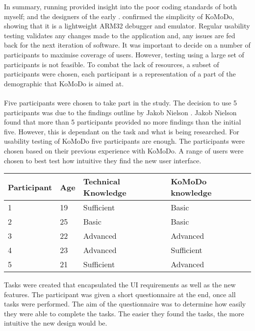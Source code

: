 In summary, running  provided insight into the poor coding standards of both myself; and the designers of the early .  confirmed the simplicity of KoMoDo, showing that it is a lightweight ARM32 debugger and emulator.
%
%
%
%
%
Regular usability testing validates any changes made to the application and, any issues are fed back for the next iteration of software. It was important to decide on a number of participants to maximise coverage of users. However, testing using a large set of participants is not feasible. To combat the lack of resources, a subset of participants were chosen, each participant is a representation of a part of the demographic that KoMoDo is aimed at.\\\\
%
Five participants were chosen to take part in the study. The decision to use 5 participants was due to the findings outline by Jakob Nielson \cite{usability_engineer}. Jakob Nielson found that more than 5 participants provided no more findings than the initial five. However, this is dependant on the task and what is being researched. For usability testing of KoMoDo five participants are enough.
%
The participants were chosen based on their previous experience with KoMoDo. A range of users were chosen to best test how intuitive they find the new user interface.
\begin{center}
\begin{tabular}{| l |  p{1cm} | p{4cm} | p{4cm} | }
		\hline
		Participant & Age & Technical Knowledge & KoMoDo knowledge \\ \hline
		1 & 19 & Sufficient & Basic \\ \hline
		2 & 25 & Basic & Basic \\ \hline
		3 & 22 & Advanced & Advanced \\ \hline
		4 & 23 & Advanced & Sufficient \\ \hline
		5 & 21 & Sufficient & Advanced \\ \hline
\end{tabular}
\end{center}

Tasks were created that encapsulated the UI requirements as well as the new features. The participant was given a short questionnaire at the end, once all tasks were performed. The aim of the questionnaire was to determine how easily they were able to complete the tasks. The easier they found the tasks, the more intuitive the new design would be.\\\\
